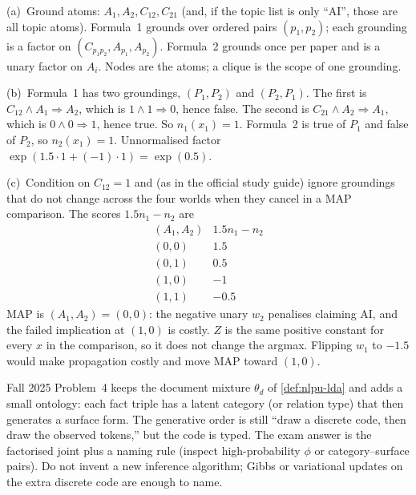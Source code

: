 \begin{solution}
(a)~Ground atoms: $A_1,A_2,C_{12},C_{21}$ (and, if the topic list is only ``AI'', those are all topic atoms). Formula~1 grounds over ordered pairs $(p_1,p_2)$; each grounding is a factor on $(C_{p_1p_2},A_{p_1},A_{p_2})$. Formula~2 grounds once per paper and is a unary factor on $A_i$. Nodes are the atoms; a clique is the scope of one grounding.

(b)~Formula~1 has two groundings, $(P_1,P_2)$ and $(P_2,P_1)$. The first is $C_{12}\wedge A_1\Rightarrow A_2$, which is $1\wedge 1\Rightarrow 0$, hence false. The second is $C_{21}\wedge A_2\Rightarrow A_1$, which is $0\wedge 0\Rightarrow 1$, hence true. So $n_1(x_1)=1$. Formula~2 is true of $P_1$ and false of $P_2$, so $n_2(x_1)=1$. Unnormalised factor $\exp(1.5\cdot 1+(-1)\cdot 1)=\exp(0.5)$.

(c)~Condition on $C_{12}=1$ and (as in the official study guide) ignore groundings that do not change across the four worlds when they cancel in a MAP comparison. The scores $1.5n_1-n_2$ are
\[
\begin{array}{c|c}
(A_1,A_2) & 1.5n_1-n_2 \\
\hline
(0,0) & 1.5 \\
(0,1) & 0.5 \\
(1,0) & -1 \\
(1,1) & -0.5
\end{array}
\]
MAP is $(A_1,A_2)=(0,0)$: the negative unary $w_2$ penalises claiming AI, and the failed implication at $(1,0)$ is costly. $Z$ is the same positive constant for every $x$ in the comparison, so it does not change the argmax. Flipping $w_1$ to $-1.5$ would make propagation costly and move MAP toward $(1,0)$.
\end{solution}

\begin{remark}
\label{rem:nlpu-onto-lda}
Fall 2025 Problem~4 keeps the document mixture $\theta_d$ of \cref{def:nlpu-lda} and adds a small ontology: each fact triple has a latent category (or relation type) that then generates a surface form. The generative order is still ``draw a discrete code, then draw the observed tokens,'' but the code is typed. The exam answer is the factorised joint plus a naming rule (inspect high-probability $\phi$ or category--surface pairs). Do not invent a new inference algorithm; Gibbs or variational updates on the extra discrete code are enough to name.
\end{remark}


